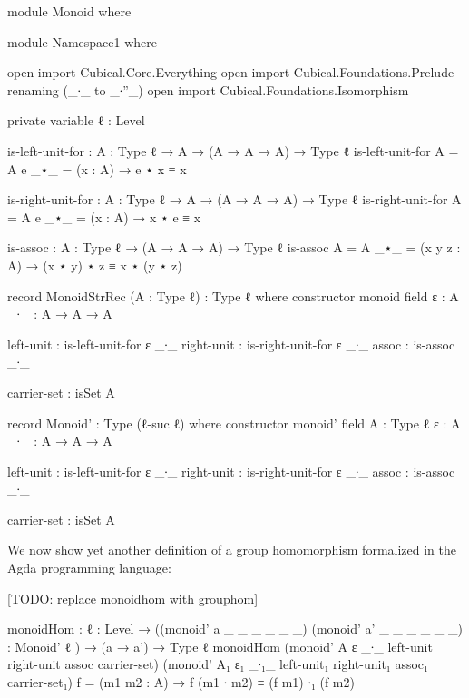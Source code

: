 \begin{code}[hide]

module Monoid where

module Namespace1 where

  open import Cubical.Core.Everything
  open import Cubical.Foundations.Prelude renaming (_∙_ to _∙''_)
  open import Cubical.Foundations.Isomorphism

  private
    variable
      ℓ : Level

  is-left-unit-for : {A : Type ℓ} → A → (A → A → A) → Type ℓ
  is-left-unit-for {A = A} e _⋆_ = (x : A) → e ⋆ x ≡ x

  is-right-unit-for : {A : Type ℓ} → A → (A → A → A) → Type ℓ
  is-right-unit-for {A = A} e _⋆_ = (x : A) → x ⋆ e ≡ x

  is-assoc : {A : Type ℓ} → (A → A → A) → Type ℓ
  is-assoc {A = A} _⋆_ = (x y z : A) → (x ⋆ y) ⋆ z ≡ x ⋆ (y ⋆ z)

  record MonoidStrRec (A : Type ℓ) : Type ℓ where
    constructor
      monoid
    field
      ε   : A
      _∙_ : A → A → A

      left-unit  : is-left-unit-for ε _∙_
      right-unit : is-right-unit-for ε _∙_
      assoc      : is-assoc _∙_

      carrier-set : isSet A

  record Monoid' : Type (ℓ-suc ℓ) where
    constructor
      monoid'
    field
      A : Type ℓ
      ε   : A
      _∙_ : A → A → A

      left-unit  : is-left-unit-for ε _∙_
      right-unit : is-right-unit-for ε _∙_
      assoc      : is-assoc _∙_

      carrier-set : isSet A

\end{code}

We now show yet another definition of a group homomorphism formalized in the
Agda programming language:

[TODO: replace monoidhom with grouphom]

\begin{code}
  monoidHom : {ℓ : Level}
            → ((monoid' a _ _ _ _ _ _) (monoid' a' _ _ _ _ _ _) : Monoid' {ℓ} )
            → (a → a') → Type ℓ
  monoidHom
    (monoid' A ε _∙_ left-unit right-unit assoc carrier-set)
    (monoid' A₁ ε₁ _∙₁_ left-unit₁ right-unit₁ assoc₁ carrier-set₁)
    f
    = (m1 m2 : A) → f (m1 ∙ m2) ≡ (f m1) ∙₁ (f m2)
\end{code}

